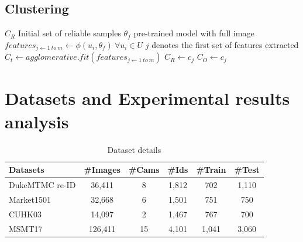 \documentclass[preprint,12pt]{elsarticle}
\begin{document}
\subsection{Clustering }
\begin{algorithm}[H]
	\caption{Clustering and reliable sample selection} 
	\begin{algorithmic}[1]
		 $C_R$ \Comment Initial set of reliable samples
		\quad $\theta_{f}$ \Comment pre-trained model with full image
		\State $features_{j\gets1~to~m} \gets \phi(u_i,\theta_{f})~\forall u_i \in U$ \Comment $j$ denotes the first set of features extracted
		\State $C_t \gets agglomerative.fit(features_{j\gets1~to~m})$
		\State $C_R \gets c_j $
		\Else
		\State $C_{O} \gets c_j$		
		\EndIf 	
		\EndProcedure
	\end{algorithmic}
	\label{algo1}
\end{algorithm}


\section{Datasets and Experimental results analysis}


\begin{table}[H]
\caption{Dataset details}
\centering
\label{table2}
	\begin{tabular}{l|c|c|c|c|c}
		\hline 
		\textbf{Datasets} & \multicolumn{1}{p{1.8cm}|}{\centering \bf \#Images} & \multicolumn{1}{p{1.7cm}|}{\centering \bf \#Cams}& \multicolumn{1}{p{1.7cm}|}{\centering \bf \#Ids} & \multicolumn{1}{p{1.7cm}|}{\centering \bf \#Train} & \multicolumn{1}{p{1.7cm}}{\centering \bf \#Test}\\
		\hline
		DukeMTMC re-ID \cite{dukemtmc} & 36,411 & 8 & 1,812 & 702 & 1,110 \\
		Market1501 \cite{market1501} & 32,668  & 6 & 1,501 & 751 & 750  \\
		CUHK03 \cite{cuhk03} & 14,097 & 2 & 1,467 & 767 & 700  \\
		MSMT17  \cite{ptgan} & 126,411 & 15 & 4,101 & 1,041 & 3,060 \\
		\hline 
\end{tabular} 
\end{table}
\end{document}
